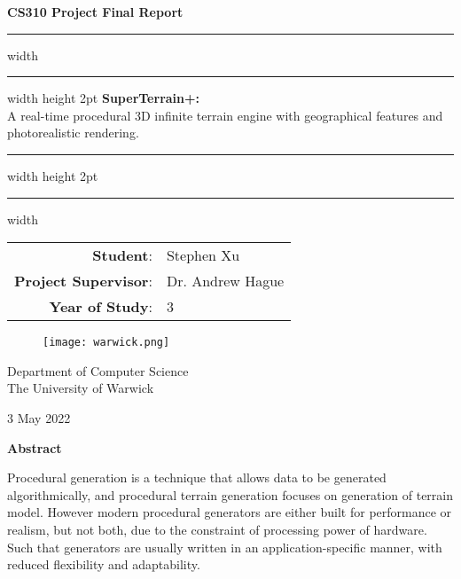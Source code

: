 \documentclass[oneside, a4paper]{report}
\begin{document}
    \begin{titlepage}
        \begin{center}
            \huge
            \vspace*{0.5cm}
            \textbf{CS310 Project Final Report}

            \vspace*{0.75cm}
            \hrule width \hsize \kern 1mm \hrule width \hsize height 2pt
            \textbf{SuperTerrain+:} \\
            A real-time procedural 3D infinite terrain engine with geographical features and photorealistic rendering.
            \newline
            \hrule width \hsize height 2pt \kern 1mm \hrule width \hsize

            \Large
            \vspace*{1.0cm}
            \begin{tabular}{rl}
                \textbf{Student}: & Stephen Xu \\
                \textbf{Project Supervisor}: & Dr. Andrew Hague \\
                \textbf{Year of Study}: & 3
            \end{tabular}

            \vspace*{4.0cm}
            \begin{figure}[H]
                \center
                \texttt{[image: warwick.png]}
            \end{figure}
            
            Department of Computer Science \\
            The University of Warwick

            \vspace*{0.5cm}
            3 May 2022
        \end{center}
    \end{titlepage}
    \newpage

    \vspace*{0.5cm}
    \Large
    \begin{center}
        \textbf{Abstract}
    \end{center}
    
    \large
    \flushleft
    Procedural generation is a technique that allows data to be generated algorithmically, and procedural terrain generation focuses on generation of terrain model. However modern procedural generators are either built for performance or realism, but not both, due to the constraint of processing power of hardware. Such that generators are usually written in an application-specific manner, with reduced flexibility and adaptability.
\end{document}
